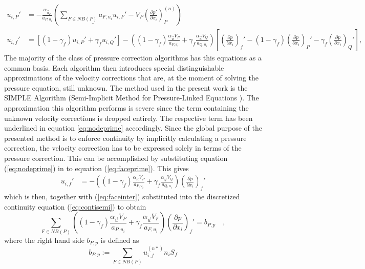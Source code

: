   \begin{align}
    \label{eq:nodeprime}
    u_{i,P}' 
    &=  
    - \frac{\alpha_{\vec{u}_P}}{a_{P,u_i}} \left(\underline{\sum_{F \in NB(P)} a_{F,u_i} u_{i,F}'}
    - V_P\left(\frac{\partial p'}{\partial x_i}\right)_P^{(n)} \right) \\[1em]
    \label{eq:faceprime}
    u_{i,f}' 
    &= 
    \left[\left(1 - \gamma_f\right) u_{i,P}' + \gamma_f u_{i,Q}' \right] 
    - 
    \left(\left(1 - \gamma_f\right) \frac{\alpha_\vec{u} V_P}{a_{P,u_i}} + \gamma_f \frac{\alpha_\vec{u} V_Q}{a_{Q,u_i}}\right)
    \left[ 
    \left(\frac{\partial p}{\partial x_i}\right)_f' 
    - \left( 1 - \gamma_f \right) \left( \frac{\partial p}{\partial x_i} \right)_P' 
    - \gamma_f \left(\frac{\partial p}{\partial x_i}\right)_Q' 
    \right],
  \end{align}
  The majority of the class of pressure correction algorithms has this equations as a common basis. Each algorithm then introduces special distinguishable approximations of the velocity corrections that are, at the moment of solving the pressure equation, still unknown. The method used in the present work is the SIMPLE Algorithm (Semi-Implicit Method for Pressure-Linked Equations \cite{spalding}). The approximation this algorithm performs is severe since the term containing the unknown velocity corrections is dropped entirely. The respective term has been underlined in equation \ref{eq:nodeprime} accordingly. Since the global purpose of the presented method is to enforce continuity by implicitly calculating a pressure correction, the velocity correction has to be expressed solely in terms of the pressure correction. This can be accomplished by substituting equation (\ref{eq:nodeprime}) in to equation (\ref{eq:faceprime}). This gives
  \begin{align}
    u_{i,f}' 
    &= 
    - 
    \left(\left(1 - \gamma_f\right) \frac{\alpha_\vec{u} V_P}{a_{P,u_i}} + \gamma_f \frac{\alpha_\vec{u} V_Q}{a_{Q,u_i}}\right)
    \left(\frac{\partial p}{\partial x_i}\right)_f' 
  \end{align}
  which is then, together with (\ref{eq:faceinter}) substituted into the discretized continuity equation (\ref{eq:contisemi}) to obtain
  \begin{equation}
    \label{eq:presscorr}
    \sum_{F \in NB(P)} \left(\left(1 - \gamma_f\right) \frac{\alpha_\vec{u} V_P}{a_{P,u_i}} + \gamma_f \frac{\alpha_\vec{u} V_F}{a_{F,u_i}}\right)
    \left(\frac{\partial p}{\partial x_i}\right)_f' 
    = b_{P,p}
    \quad,
  \end{equation}
  where the right hand side \(b_{P,p}\) is defined as
  \begin{equation}
    b_{P,p} := \sum_{F \in NB(P)} u_{i,f}^{(n*)} n_i S_f
  \end{equation}
  
